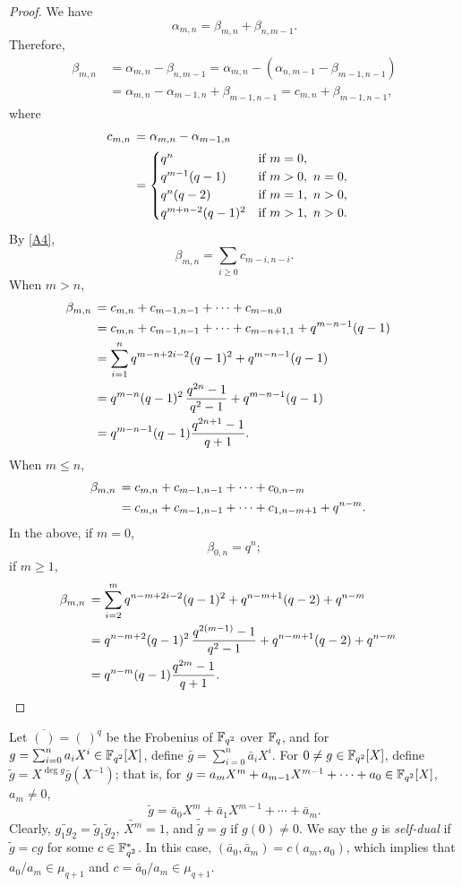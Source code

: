 \documentclass{amsart}
\numberwithin{equation}{section}
\theoremstyle{definition}
\newcommand{\f}{\Bbb F}
\begin{document}
\begin{proof}
We have
\[
\alpha_{m,n}=\beta_{m,n}+\beta_{n,m-1}.
\]
Therefore,
\begin{align}\tag{A\theaeqno}\label{A4}
\beta_{m,n}\,&=\alpha_{m,n}-\beta_{n,m-1}=\alpha_{m,n}-(\alpha_{n,m-1}-\beta_{m-1,n-1})\\ 
&=\alpha_{m,n}-\alpha_{m-1,n}+\beta_{m-1,n-1}=c_{m,n}+\beta_{m-1,n-1},\nonumber
\end{align}
where
\begin{align*}
c_{m,n}\,&=\alpha_{m,n}-\alpha_{m-1,n}\cr
&=\begin{cases}
q^n&\text{if}\ m=0,\cr
q^{m-1}(q-1)&\text{if}\ m>0,\ n=0,\cr
q^{n}(q-2)&\text{if}\ m=1,\ n>0,\cr
q^{m+n-2}(q-1)^2&\text{if}\ m>1,\ n>0.
\end{cases}
\end{align*}
By \eqref{A4},
\[
\beta_{m,n}=\sum_{i\ge 0}c_{m-i,n-i}.
\]
When $m>n$,
\begin{align*}
\beta_{m,n}\,&=c_{m,n}+c_{m-1,n-1}+\cdots+c_{m-n,0}\cr
&=c_{m,n}+c_{m-1,n-1}+\cdots+c_{m-n+1,1}+q^{m-n-1}(q-1)\cr
&=\sum_{i=1}^nq^{m-n+2i-2}(q-1)^2+q^{m-n-1}(q-1)\cr
&=q^{m-n}(q-1)^2\,\frac{q^{2n}-1}{q^2-1}+q^{m-n-1}(q-1)\cr
&=q^{m-n-1}(q-1)\frac{q^{2n+1}-1}{q+1}.
\end{align*}
When $m\le n$,
\begin{align*}
\beta_{m,n}\,&=c_{m,n}+c_{m-1,n-1}+\cdots+c_{0,n-m}\cr
&=c_{m,n}+c_{m-1,n-1}+\cdots+c_{1,n-m+1}+q^{n-m}.
\end{align*}
In the above, if $m=0$,
\[
\beta_{0,n}=q^n;
\]
if $m\ge 1$,
\begin{align*}
\beta_{m,n}\,&=\sum_{i=2}^mq^{n-m+2i-2}(q-1)^2+q^{n-m+1}(q-2)+q^{n-m}\cr
&=q^{n-m+2}(q-1)^2\,\frac{q^{2(m-1)}-1}{q^2-1}+q^{n-m+1}(q-2)+q^{n-m}\cr
&=q^{n-m}(q-1)\frac{q^{2m}-1}{q+1}.
\end{align*}
\end{proof}

Let $\overline{(\ )}=(\ )^q$ be the Frobenius of $\f_{q^2}$ over $\f_q$, and for $g=\sum_{i=0}^na_iX^i\in\f_{q^2}[X]$, define $\bar g=\sum_{i=0}^n\bar a_iX^i$.
For $0\ne g\in\f_{q^2}[X]$, define $\tilde g=X^{\deg g}\bar g(X^{-1})$; that is, for $g=a_mX^m+a_{m-1}X^{m-1}+\cdots+a_0\in\f_{q^2}[X]$, $a_m\ne 0$,
\[
\tilde g=\bar a_0X^m+\bar a_1X^{m-1}+\cdots+\bar a_m.
\]
Clearly, $\widetilde{g_1g_2}=\tilde g_1\tilde g_2$, $\widetilde{X^m}=1$, and $\tilde{\tilde g}=g$ if $g(0)\ne 0$. We say the $g$ is {\em self-dual} if $\tilde g=cg$ for some $c\in\f_{q^2}^*$. In this case, $(\bar a_0,\bar a_m)=c(a_m,a_0)$, which implies that $a_0/a_m\in\mu_{q+1}$ and $c=\bar a_0/a_m\in\mu_{q+1}$.
\end{document}
